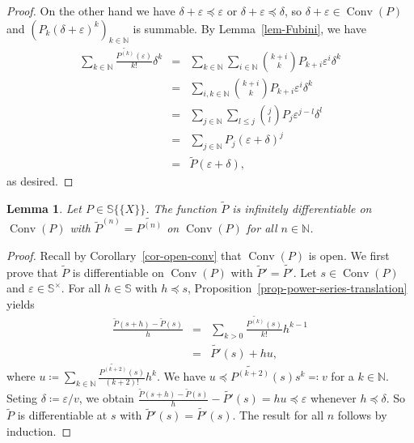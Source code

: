 \documentclass{article}
\newcommand{\assign}{\coloneqq}
\newcommand{\backassign}{\eqqcolon}
\newcommand{\tmop}[1]{\ensuremath{\operatorname{#1}}}
\newtheorem{lemma}[theorem]{Lemma}
\theoremstyle{remark}\newtheorem*{convention*}{Convention}
\begin{document}
\begin{proof}
  On the other hand we have $\delta + \varepsilon \preccurlyeq \varepsilon$ or
  $\delta + \varepsilon \preccurlyeq \delta$, so $\delta + \varepsilon \in
  \tmop{Conv} (P)$ and $(P_k  (\delta + \varepsilon)^k)_{k \in \mathbb{N}}$ is
  summable. By Lemma~\ref{lem-Fubini}, we have
  \begin{eqnarray*}
    \sum_{k \in \mathbb{N}} \frac{\widetilde{P^{(k)}} (\varepsilon)}{k!}
    \delta^k & = & \sum_{k \in \mathbb{N}} \sum_{i \in \mathbb{N}} \binom{k +
    i}{k} P_{k + i} \varepsilon^i \delta^k\\
    & = & \sum_{i, k \in \mathbb{N}} \binom{k + i}{k} P_{k + i} \varepsilon^i
    \delta^k\\
    & = & \sum_{j \in \mathbb{N}} \sum_{l \leqslant j} \binom{j}{l} P_j
    \varepsilon^{j - l} \delta^l\\
    & = & \sum_{j \in \mathbb{N}} P_j  (\varepsilon + \delta)^j\\
    & = & \tilde{P} (\varepsilon + \delta),
  \end{eqnarray*}
  as desired.
\end{proof}

\begin{lemma}
  \label{lem-true-derivative-power-series}Let $P \in \mathbb{S} \{ \!\! \{X\}
  \!\! \}$. The function $\tilde{P}$ is infinitely differentiable on
  $\tmop{Conv} (P)$ with $\tilde{P}^{(n)} = \widetilde{P^{(n)}}$ on
  $\tmop{Conv} (P)$ for all $n \in \mathbb{N}$.
\end{lemma}

\begin{proof}
  Recall by Corollary~\ref{cor-open-conv} that $\tmop{Conv} (P)$ is open. We
  first prove that $\tilde{P}$ is differentiable on $\tmop{Conv} (P)$ with
  $\tilde{P}' = \widetilde{P'}$. Let $s \in \tmop{Conv} (P)$ and $\varepsilon
  \in \mathbb{S}^{\times}$. For all $h \in \mathbb{S}$ with $h \preccurlyeq
  s$, Proposition~\ref{prop-power-series-translation} yields
  \begin{eqnarray*}
    \frac{\tilde{P} (s + h) - \tilde{P} (s)}{h} & = & \sum_{k > 0}
    \frac{\widetilde{P^{(k)}} (s)}{k!} h^{k - 1}\\
    & = & \widetilde{P'} (s) + hu,
  \end{eqnarray*}
  where $u \assign \sum_{k \in \mathbb{N}} \frac{\widetilde{P^{(k + 2)}}
  (s)}{(k + 2) !} h^k$. We have $u \preccurlyeq \widetilde{P^{(k + 2)}} (s)
  s^k \backassign v$ for a $k \in \mathbb{N}$. Seting $\delta \assign
  \varepsilon / v$, we obtain $\frac{\tilde{P} (s + h) - \tilde{P} (s)}{h} -
  \widetilde{P'} (s) = hu \preccurlyeq \varepsilon$ whenever $h \preccurlyeq
  \delta$. So $\tilde{P}$ is differentiable at $s$ with $\tilde{P}' (s) =
  \widetilde{P'} (s)$. The result for all $n$ follows by induction.
\end{proof}
\end{document}
